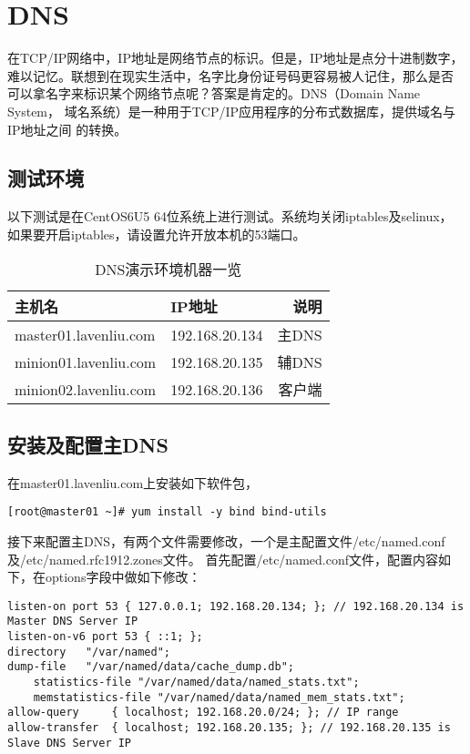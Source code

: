 \chapter{DNS}
\label{chap:dns}

在TCP/IP网络中，IP地址是网络节点的标识。但是，IP地址是点分十进制数字，
难以记忆。联想到在现实生活中，名字比身份证号码更容易被人记住，那么是否
可以拿名字来标识某个网络节点呢？答案是肯定的。DNS（Domain Name System，
域名系统）是一种用于TCP/IP应用程序的分布式数据库，提供域名与IP地址之间
的转换。

\section{测试环境}
\label{sec:dnsTestEnv}

以下测试是在CentOS6U5 64位系统上进行测试。系统均关闭iptables及selinux，
如果要开启iptables，请设置允许开放本机的53端口。

\begin{table}[htbp]
  \centering
    \caption{DNS演示环境机器一览}
    \label{tab:dnsMachines}
    \begin{tabular}{llr}
      \toprule
      主机名     & IP地址 & 说明 \\
      \midrule
      master01.lavenliu.com  & 192.168.20.134 &  主DNS \\
      minion01.lavenliu.com  & 192.168.20.135 &  辅DNS \\
      minion02.lavenliu.com  & 192.168.20.136 &  客户端 \\
      \bottomrule
    \end{tabular}
\end{table}

\section{安装及配置主DNS}
\label{sec:configMasterDNS}

在master01.lavenliu.com上安装如下软件包，

\begin{verbatim}
[root@master01 ~]# yum install -y bind bind-utils
\end{verbatim}

接下来配置主DNS，有两个文件需要修改，一个是主配置文件/etc/named.conf及/etc/named.rfc1912.zones文件。
首先配置/etc/named.conf文件，配置内容如下，在options字段中做如下修改：

\begin{verbatim}
listen-on port 53 { 127.0.0.1; 192.168.20.134; }; // 192.168.20.134 is Master DNS Server IP
listen-on-v6 port 53 { ::1; };
directory	"/var/named";
dump-file	"/var/named/data/cache_dump.db";
	statistics-file "/var/named/data/named_stats.txt";
	memstatistics-file "/var/named/data/named_mem_stats.txt";
allow-query		{ localhost; 192.168.20.0/24; }; // IP range
allow-transfer	{ localhost; 192.168.20.135; }; // 192.168.20.135 is Slave DNS Server IP
\end{verbatim}

